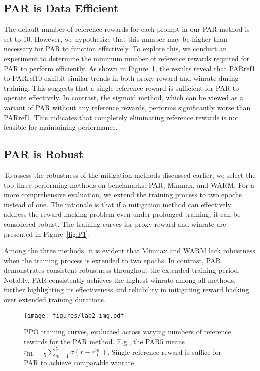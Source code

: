 \subsection{PAR is Data Efficient}
The default number of reference rewards for each prompt in our PAR method is set to 10. However, we hypothesize that this number may be higher than necessary for PAR to function effectively. To explore this, we conduct an experiment to determine the minimum number of reference rewards required for PAR to perform efficiently. As shown in Figure~\ref{fig:lab2}, the results reveal that PARref1 to PARref10 exhibit similar trends in both proxy reward and winrate during training. This suggests that a single reference reward is sufficient for PAR to operate effectively. In contrast, the sigmoid method, which can be viewed as a variant of PAR without any reference rewards, performs significantly worse than PARref1. This indicates that completely eliminating reference rewards is not feasible for maintaining performance.

\subsection{PAR is Robust}
To assess the robustness of the mitigation methods discussed earlier, we select the top three performing methods on benchmarks: PAR, Minmax, and WARM. For a more comprehensive evaluation, we extend the training process to two epochs instead of one. The rationale is that if a mitigation method can effectively address the reward hacking problem even under prolonged training, it can be considered robust. The training curves for proxy reward and winrate are presented in Figure~\ref{fig:P1}.

Among the three methods, it is evident that Minmax and WARM lack robustness when the training process is extended to two epochs. In contrast, PAR demonstrates consistent robustness throughout the extended training period. Notably, PAR consistently achieves the highest winrate among all methods, further highlighting its effectiveness and reliability in mitigating reward hacking over extended training durations.

\begin{figure}[t]
\centering
\texttt{[image: figures/lab2\_img.pdf]}
\caption{PPO training curves, evaluated across varying numbers of reference rewards for the PAR method. E.g., the PAR5 means $r_{\text{RL}}=\frac{1}{5}\sum_{m=1}^5\sigma(r-r_{\text{ref}}^m)$. Single reference reward is suffice for PAR to achieve comparable winrate.}
\label{fig:lab2}
\end{figure}